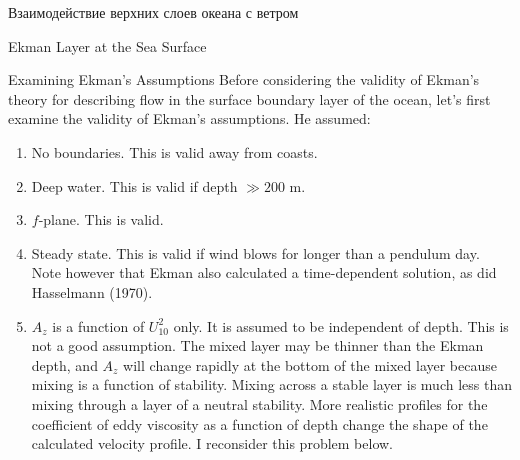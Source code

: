 \begin{chapter}{Взаимодействие верхних слоев океана с ветром}
\begin{section}{Ekman Layer at the Sea Surface}
\begin{paragraph}{Examining Ekman's Assumptions}
Before considering the
validity of Ekman's theory for describing flow in the surface boundary
layer of the ocean, let's first examine the validity of Ekman's
assumptions. He assumed:
%
%
\begin{enumerate}
\item 
No boundaries. This is valid away from coasts.

\item 
Deep water. This is valid if depth $\gg 200$ m.

\item 
$f$-plane. This is valid.

\item 
Steady state. This is valid if wind blows for longer than a pendulum
day.  Note however that Ekman also calculated a time-dependent
solution, as did Hasselmann (1970).
%

\item $A_z$ is a function of $U^2_{10}$ only. It is assumed to be
independent of depth. This is not a good assumption. The mixed
layer may be thinner than the Ekman
depth, and $A_z$ will change rapidly at the bottom of the mixed
layer because mixing is a function
of stability. Mixing across a stable layer is much less than mixing
through a layer of a neutral stability. More realistic profiles for
the coefficient of eddy viscosity as a function of depth change the
shape of the calculated velocity profile. I reconsider this problem
below.
%


\end{enumerate}
\end{paragraph}
\end{section}
\end{chapter}
